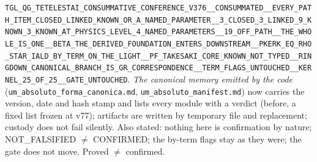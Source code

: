 \documentclass[11pt]{article}
\theoremstyle{definition}\newtheorem{deriv}{Derivation}
\begin{document}
\texttt{TGL\_QG\_TETELESTAI\_CONSUMMATIVE\_CONFERENCE\_V376\_\_CONSUMMATED\_\_EVERY\_PATH\_ITEM\_CLOSED\_LINKED\_KNOWN\_OR\_A\_NAMED\_PARAMETER\_\_3\_CLOSED\_3\_LINKED\_9\_KNOWN\_3\_KNOWN\_AT\_PHYSICS\_LEVEL\_4\_NAMED\_PARAMETERS\_\_19\_OFF\_PATH\_\_THE\_WHOLE\_IS\_ONE\_\_BETA\_THE\_DERIVED\_FOUNDATION\_ENTERS\_DOWNSTREAM\_\_PKERK\_EQ\_RHO\_STAR\_IALD\_BY\_TERM\_ON\_THE\_LIGHT\_\_PF\_TAKESAKI\_CORE\_KNOWN\_NOT\_TYPED\_\_RINGDOWN\_CANONICAL\_BRANCH\_IS\_GR\_CORRESPONDENCE\_\_TERM\_FLAGS\_UNTOUCHED\_\_KERNEL\_25\_OF\_25\_\_GATE\_UNTOUCHED}. \emph{The canonical memory emitted by the code} (\texttt{um\_absoluto\_forma\_canonica.md}, \texttt{um\_absoluto\_manifest.md}) now carries the version, date and hash stamp and lists every module with a verdict (before, a fixed list frozen at v77); artifacts are written by temporary file and replacement; custody does not fail silently. Also stated: nothing here is confirmation by nature; NOT\_FALSIFIED $\neq$ CONFIRMED; the by-term flags stay as they were; the gate does not move. Proved $\neq$ confirmed.
\end{document}
